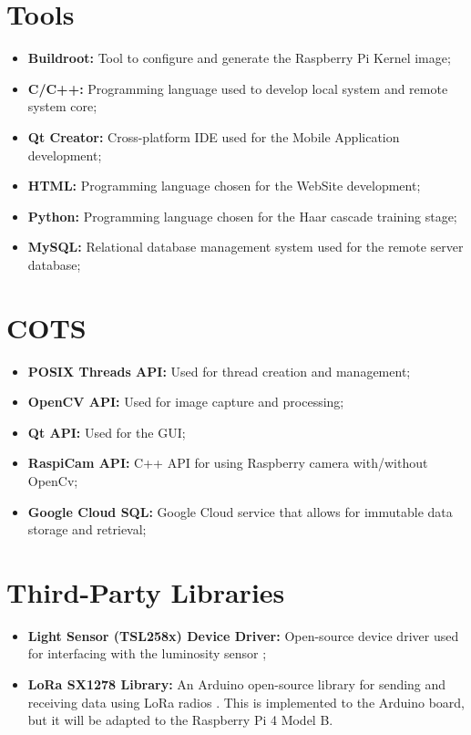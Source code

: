 \clearpage
\section{Tools}

\begin{itemize}
	\item \textbf{Buildroot:} Tool to configure and generate the Raspberry Pi Kernel image;
	\item \textbf{C/C++:} Programming language used to develop local system and remote system core;
	\item \textbf{Qt Creator:} Cross-platform IDE used for the Mobile Application development;
	\item \textbf{HTML:} Programming language chosen for the WebSite development;
	\item \textbf{Python:} Programming language chosen for the Haar cascade training stage;
	\item \textbf{MySQL:} Relational database management system used for the remote server database;
\end{itemize}

\section{COTS}

\begin{itemize}
	\item \textbf{POSIX Threads API:} Used for thread creation and management;
	\item \textbf{OpenCV API:} Used for image capture and processing;
	\item \textbf{Qt API:} Used for the GUI;
	\item \textbf{RaspiCam API:} C++ API for using Raspberry camera with/without OpenCv;
	\item \textbf{Google Cloud SQL:} Google Cloud service that allows for immutable data storage and retrieval;
\end{itemize}

\section{Third-Party Libraries}

\begin{itemize}
	\item \textbf{Light Sensor (TSL258x) Device Driver:} Open-source device driver used for interfacing with the luminosity sensor \cite{code_tsl};
	\item \textbf{LoRa SX1278 Library:} An Arduino open-source library for sending and receiving data using LoRa radios \cite{sx1278_lib}. This is implemented to the Arduino board, but it will be adapted to the Raspberry Pi 4 Model B.
\end{itemize}
